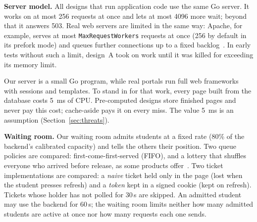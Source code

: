 \textbf{Server model.} All designs that run application code use the same Go
server. It works on at most 256 requests at once and lets at most 4096 more
wait; beyond that it answers 503. Real web servers are limited in the same
way: Apache, for example, serves at most \texttt{MaxRequestWorkers} requests at
once (256 by default in its prefork mode) and queues further connections up to
a fixed backlog~\cite{apache2026mpm}. In early tests without such a limit,
design~A took on work until it was killed for exceeding its memory limit.

Our server is a small Go program, while real portals run full web frameworks
with sessions and templates. To stand in for that work, every page built from
the database costs \SI{5}{ms} of CPU. Pre-computed designs store finished
pages and never pay this cost; cache-aside pays it on every miss. The value
\SI{5}{ms} is an assumption (Section~\ref{sec:threats}).

\textbf{Waiting room.} Our waiting room admits students at a fixed rate (80\%
of the backend's calibrated capacity) and tells the others their position.
Two queue policies are compared: first-come-first-served (FIFO), and a
lottery that shuffles everyone who arrived before release, as some products
offer~\cite{cloudflare2026queue}. Two ticket implementations are compared: a
\emph{naive} ticket held only in the page (lost when the student presses
refresh) and a \emph{token} kept in a signed cookie (kept on refresh).
Tickets whose holder has not polled for 30\,s are skipped. An admitted student
may use the backend for 60\,s; the waiting room limits neither how many
admitted students are active at once nor how many requests each one sends.
